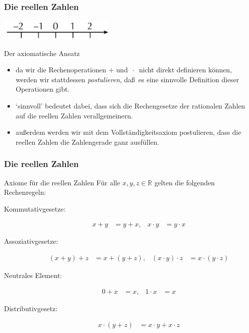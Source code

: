 \documentclass{beamer}
\renewcommand{\emph}[1]{{\textcolor{solarizedRed}{\itshape #1}}}
\newcommand\RR{\mathbb R}
\renewcommand{\ae}{\"a}
\renewcommand{\oe}{\"o}
\newcommand{\ue}{\"u}
\newcommand{\mytitle}{Die reellen Zahlen}
\begin{document}
\begin{frame}\frametitle{\mytitle}
	\hfill\includegraphics[height=10mm]{pics/integers.pdf}
	\begin{block}{Der axiomatische Ansatz}
	\begin{itemize}
		\item da wir die Rechenoperationen $+$ und $\,\cdot\,$ nicht direkt definieren k\oe nnen, werden wir stattdessen \emph{postulieren}, da\ss\ es eine sinnvolle Definition dieser Operationen gibt.
		\item `sinnvoll' bedeutet dabei, dass sich die Rechengesetze der rationalen Zahlen auf die reellen Zahlen verallgemeinern.
		\item au\ss erdem werden wir mit dem \alert{Vollst\ae ndigkeitsaxiom} postulieren, dass die reellen Zahlen die Zahlengerade ganz ausf\ue llen.
	\end{itemize}
	\end{block}
\end{frame}

\begin{frame}\frametitle{\mytitle}
	\begin{block}{Axiome f\ue r die reellen Zahlen}
		F\ue r alle $x,y,z\in\RR$ gelten die folgenden Rechenregeln:
\begin{description}
			\item[Kommutativgesetze:] 
					\begin{align*}
						x+y&=y+x,&x\cdot y&=y\cdot x
			\end{align*}
			\item[Assoziativgesetze:]	
				\begin{align*}
					(x+y)+z&=x+(y+z),&(x\cdot y)\cdot z&=x\cdot(y\cdot z)
				\end{align*}
			\item[Neutrales Element:]
				\begin{align*}
					0+x&=x,&1\cdot x&=x
				\end{align*}
			\item[Distributivgesetz:]
				\begin{align*}
					x\cdot(y+z)&=x\cdot y+x\cdot z
				\end{align*}
		\end{description}
	\end{block}
\end{frame}
\end{document}
